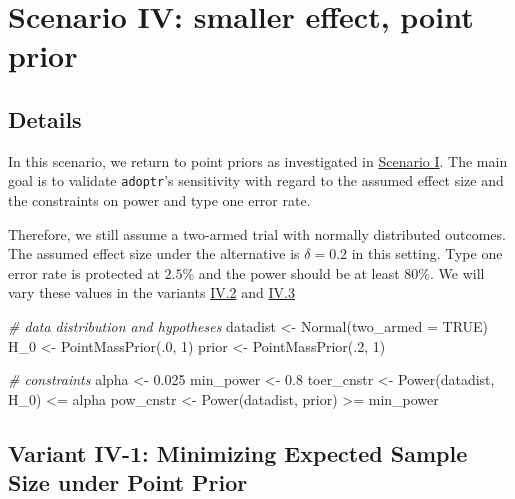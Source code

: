 \documentclass[
]{book}
\newenvironment{Shaded}{\begin{snugshade}}{\end{snugshade}}
\newcommand{\AttributeTok}[1]{\textcolor[rgb]{0.77,0.63,0.00}{#1}}
\newcommand{\CommentTok}[1]{\textcolor[rgb]{0.56,0.35,0.01}{\textit{#1}}}
\newcommand{\ConstantTok}[1]{\textcolor[rgb]{0.00,0.00,0.00}{#1}}
\newcommand{\DecValTok}[1]{\textcolor[rgb]{0.00,0.00,0.81}{#1}}
\newcommand{\FloatTok}[1]{\textcolor[rgb]{0.00,0.00,0.81}{#1}}
\newcommand{\FunctionTok}[1]{\textcolor[rgb]{0.00,0.00,0.00}{#1}}
\newcommand{\NormalTok}[1]{#1}
\newcommand{\OtherTok}[1]{\textcolor[rgb]{0.56,0.35,0.01}{#1}}
\newcommand{\SpecialCharTok}[1]{\textcolor[rgb]{0.00,0.00,0.00}{#1}}
\begin{document}
\hypertarget{scenarioIV}{%
\chapter{Scenario IV: smaller effect, point prior}\label{scenarioIV}}

\hypertarget{details-3}{%
\section{Details}\label{details-3}}

In this scenario, we return to point priors as investigated in
\protect\hyperlink{scenarioI}{Scenario I}.
The main goal is to validate \texttt{adoptr}'s sensitivity with regard to
the assumed effect size and the constraints on power and type one error rate.

Therefore, we still assume a two-armed trial with normally distributed outcomes.
The assumed effect size under the alternative is \(\delta = 0.2\) in this setting.
Type one error rate is protected at \(2.5\%\) and the power should be at least
\(80\%\). We will vary these values in the variants \protect\hyperlink{variantIV.2}{IV.2} and
\protect\hyperlink{variantIV.3}{IV.3}

\begin{Shaded}
\begin{Highlighting}[]
\CommentTok{\# data distribution and hypotheses}
\NormalTok{datadist   }\OtherTok{\textless{}{-}} \FunctionTok{Normal}\NormalTok{(}\AttributeTok{two\_armed =} \ConstantTok{TRUE}\NormalTok{)}
\NormalTok{H\_0        }\OtherTok{\textless{}{-}} \FunctionTok{PointMassPrior}\NormalTok{(.}\DecValTok{0}\NormalTok{, }\DecValTok{1}\NormalTok{)}
\NormalTok{prior      }\OtherTok{\textless{}{-}} \FunctionTok{PointMassPrior}\NormalTok{(.}\DecValTok{2}\NormalTok{, }\DecValTok{1}\NormalTok{)}

\CommentTok{\# constraints}
\NormalTok{alpha      }\OtherTok{\textless{}{-}} \FloatTok{0.025}
\NormalTok{min\_power  }\OtherTok{\textless{}{-}} \FloatTok{0.8}
\NormalTok{toer\_cnstr }\OtherTok{\textless{}{-}} \FunctionTok{Power}\NormalTok{(datadist, H\_0)   }\SpecialCharTok{\textless{}=}\NormalTok{ alpha}
\NormalTok{pow\_cnstr  }\OtherTok{\textless{}{-}} \FunctionTok{Power}\NormalTok{(datadist, prior) }\SpecialCharTok{\textgreater{}=}\NormalTok{ min\_power}
\end{Highlighting}
\end{Shaded}

\hypertarget{variantIV_1}{%
\section{Variant IV-1: Minimizing Expected Sample Size under Point Prior}\label{variantIV_1}}
\end{document}
